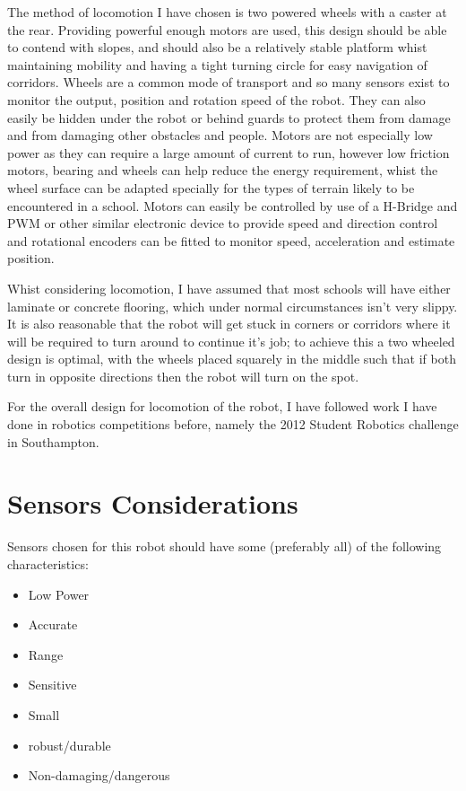 \documentclass[10pt]{article}
\begin{document}
      The method of locomotion I have chosen is two powered wheels with a caster at the rear. Providing powerful enough motors are used, this design should be able to contend with slopes, and should also be a relatively stable platform whist maintaining mobility and having a tight turning circle for easy navigation of corridors. Wheels are a common mode of transport and so many sensors exist to monitor the output, position and rotation speed of the robot. They can also easily be hidden under the robot or behind guards to protect them from damage and from damaging other obstacles and people. Motors are not especially low power as they can require a large amount of current to run, however low friction motors, bearing and wheels can help reduce the energy requirement, whist the wheel surface can be adapted specially for the types of terrain likely to be encountered in a school. Motors can easily be controlled by use of a H-Bridge and PWM or other similar electronic device to provide speed and direction control and rotational encoders can be fitted to monitor speed, acceleration and estimate position.

      Whist considering locomotion, I have assumed  that most schools will have either laminate or concrete flooring, which under normal circumstances isn't very slippy. It is also reasonable that the robot will get stuck in corners or corridors where it will be required to turn around to continue it's job; to achieve this a two wheeled design is optimal, with the wheels placed squarely in the middle such that if both turn in opposite directions then the robot will turn on the spot. 

      For the overall design for locomotion of the robot, I have followed work I have done in robotics competitions before, namely the 2012 Student Robotics challenge in Southampton.\cite{systemetricBlogspot}\cite{srobo} 

  \newpage

  \section{Sensors Considerations}
    Sensors chosen for this robot should have some (preferably all) of the following characteristics:
    \begin{itemize}
      \item Low Power
      \item Accurate
      \item Range
      \item Sensitive
      \item Small
      \item robust/durable
      \item Non-damaging/dangerous
    \end{itemize}
\end{document}
